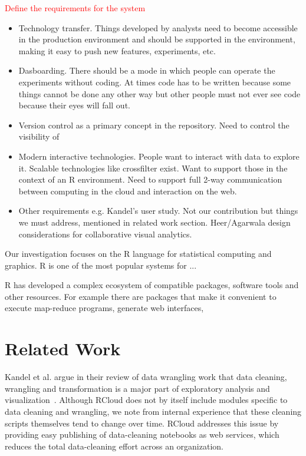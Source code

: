 \documentclass[review,journal]{vgtc}         %
\newcommand{\todo}[1]{\textcolor{red}{#1}}
\begin{document}
\todo{Define the requirements for the system}
\begin{itemize}
\item Technology transfer. Things developed by analysts need to become accessible in the production environment and should be supported in the environment, making it easy to push new features, experiments, etc.
\item Dasboarding. There should be a mode in which people can operate the experiments without coding. At times code has to be written because some things cannot be done any other way but other people must not ever see code because their eyes will fall out.
\item Version control as a primary concept in the repository. Need to control the visibility of 
\item Modern interactive technologies. People want to interact with data to explore it. Scalable technologies like crossfilter exist. Want to support those in the context of an R environment. Need to support full 2-way communication between computing in the cloud and interaction on the web.
\item Other requirements e.g. Kandel's user study. Not our contribution but things we must address, mentioned in related work section. Heer/Agarwala design considerations for collaborative visual analytics.
\end{itemize}

Our investigation focuses on the R language \cite{RCoreTeam:2013:R}
for statistical computing and graphics. R is one of the most popular
systems for ...

R has developed a complex ecosystem of compatible packages, software
tools and other resources. For example there are packages that make
it convenient to execute map-reduce programs, generate web interfaces,

\section{Related Work}

Kandel et al. argue in their review of data wrangling work that data
cleaning, wrangling and transformation is a major part of exploratory
analysis and visualization~\cite{Kandel:2011:RDI}. Although RCloud
does not by itself include modules specific to data cleaning and
wrangling, we note from internal experience that these cleaning
scripts themselves tend to change over time. RCloud addresses this
issue by providing easy publishing of data-cleaning notebooks as web
services, which reduces the total data-cleaning effort across an
organization.
\end{document}
